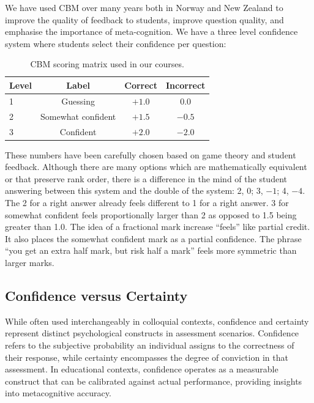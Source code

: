 \documentclass[sigconf]{acmart}
\begin{document}
We have used CBM over many years both in Norway and New Zealand to improve the quality of feedback to students, improve question quality, and emphasise the importance of meta-cognition. We have a three level confidence system where students select their confidence per question:

\begin{table}[h]
\centering
\caption{CBM scoring matrix used in our courses.}
\label{tab:cbm_scoring}
\begin{tabular}{lccc}
\toprule
\textbf{Level} & \textbf{Label} & \textbf{Correct} & \textbf{Incorrect} \\
\midrule
1 & Guessing & $+1.0$ & $0.0$ \\
2 & Somewhat confident & $+1.5$ & $-0.5$ \\
3 & Confident & $+2.0$ & $-2.0$ \\
\bottomrule
\end{tabular}
\end{table}

These numbers have been carefully chosen based on game theory and student feedback. Although there are many options which are mathematically equivalent or that preserve rank order, there is a difference in the mind of the student answering between this system and the double of the system: 2, 0; 3, $-1$; 4, $-4$. The 2 for a right answer already feels different to 1 for a right answer. 3 for somewhat confident feels proportionally larger than 2 as opposed to 1.5 being greater than 1.0. The idea of a fractional mark increase ``feels'' like partial credit. It also places the somewhat confident mark as a partial confidence. The phrase ``you get an extra half mark, but risk half a mark'' feels more symmetric than larger marks.


\subsection{Confidence versus Certainty}

While often used interchangeably in colloquial contexts, confidence and certainty represent distinct psychological constructs in assessment scenarios. Confidence refers to the subjective probability an individual assigns to the correctness of their response, while certainty encompasses the degree of conviction in that assessment. In educational contexts, confidence operates as a measurable construct that can be calibrated against actual performance, providing insights into metacognitive accuracy.
\end{document}

